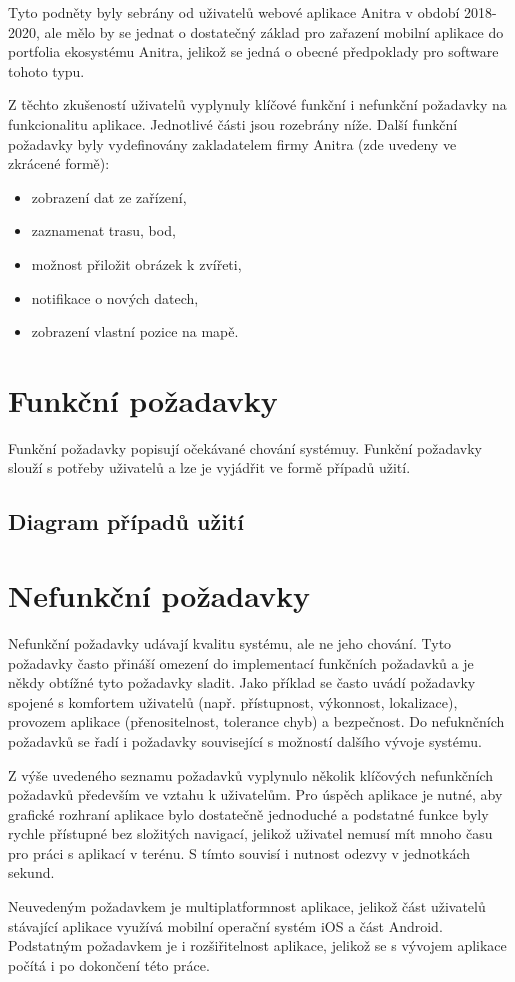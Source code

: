 Tyto podněty byly sebrány od uživatelů webové aplikace Anitra v období 2018-2020, ale mělo by se jednat o dostatečný základ pro zařazení mobilní aplikace do portfolia ekosystému Anitra, jelikož se jedná o obecné předpoklady pro software tohoto typu.

Z těchto zkušeností uživatelů vyplynuly klíčové funkční i nefunkční požadavky na funkcionalitu aplikace. Jednotlivé části jsou rozebrány níže. Další funkční požadavky byly vydefinovány zakladatelem firmy Anitra (zde uvedeny ve zkrácené formě):

\begin{itemize}
	\item zobrazení dat ze zařízení,
	\item zaznamenat trasu, bod,
	\item možnost přiložit obrázek k zvířeti,
	\item notifikace o nových datech,
	\item zobrazení vlastní pozice na mapě.
\end{itemize}

\section{Funkční požadavky}

Funkční požadavky popisují očekávané chování systémuy. Funkční požadavky slouží s potřeby uživatelů a lze je vyjádřit ve formě případů užití. 

\subsection{Diagram případů užití}

\section{Nefunkční požadavky}

Nefunkční požadavky udávají kvalitu systému, ale ne jeho chování. Tyto požadavky často přináší omezení do implementací funkčních požadavků a je někdy obtížné tyto požadavky sladit. Jako příklad se často uvádí požadavky spojené s komfortem uživatelů (např. přístupnost, výkonnost, lokalizace), provozem aplikace (přenositelnost, tolerance chyb) a bezpečnost. Do nefuknčních požadavků se řadí i požadavky související s možností dalšího vývoje systému.

Z výše uvedeného seznamu požadavků vyplynulo několik klíčových nefunkčních požadavků především ve vztahu k uživatelům. Pro úspěch aplikace je nutné, aby grafické rozhraní aplikace bylo dostatečně jednoduché a podstatné funkce byly rychle přístupné bez složitých navigací, jelikož uživatel nemusí mít mnoho času pro práci s aplikací v terénu. S tímto souvisí i nutnost odezvy v jednotkách sekund. 

Neuvedeným požadavkem je multiplatformnost aplikace, jelikož část uživatelů stávající aplikace využívá mobilní operační systém iOS a část Android. Podstatným požadavkem je i rozšiřitelnost aplikace, jelikož se s vývojem aplikace počítá i po dokončení této práce. 

